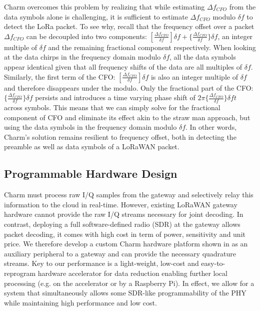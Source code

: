 Charm overcomes this problem by realizing that while estimating $\Delta
f_{CFO}$ from the data symbols alone is challenging, it is sufficient to
estimate $\Delta f_{CFO}$ modulo $\delta f$ to detect the LoRa packet. To see
why, recall that the frequency offset over a packet $\Delta f_{CFO}$ can be
decoupled into two components: $[\frac{\Delta f_{CFO}}{\delta f}]\delta f + \{\frac{\Delta f_{CFO}}{\delta f}\}\delta f$, an
integer multiple of $\delta f$ and the remaining fractional component
respectively. When looking at the data chirps in the frequency domain modulo
$\delta f$, all the data symbols appear identical given that all frequency
shifts of the data are all multiples of $\delta f$. Similarly, the first term of the CFO:
$[\frac{\Delta f_{CFO}}{\delta f}]\delta f$ is also an integer multiple of $\delta f$ and therefore disappears under the modulo. Only the fractional part of the CFO: $\{\frac{\Delta f_{CFO}}{\delta f}\}\delta f$ persists
and introduces a time varying phase shift of $2 \pi \{\frac{\Delta f_{CFO}}{\delta f}\}\delta f t$
across symbols. This means that we can simply solve for the fractional component of CFO and eliminate its effect akin to the straw man approach, but using the data
symbols in the frequency domain modulo $\delta f$. In other words, Charm's
solution remains resilient to frequency offset, both in detecting the preamble
as well as data symbols of a LoRaWAN packet.

\subsection{Programmable Hardware Design}
\label{sec:hardware}

Charm must process raw I/Q samples from the gateway and selectively relay this
information to the cloud in real-time. However, existing LoRaWAN gateway
hardware cannot provide the raw I/Q streams necessary for joint decoding. In
contrast, deploying a full software-defined radio (SDR) at the gateway allows
packet decoding, it comes with high cost in term of power, sensitivity and
unit price. We therefore develop a custom Charm hardware platform shown in
 as an auxiliary peripheral to a gateway and can
provide the necessary quadrature streams. Key to our performance is a
light-weight, low-cost and easy-to-reprogram hardware accelerator for data
reduction enabling further local processing (e.g. on the accelerator or by a
Raspberry Pi). In effect, we allow for a system that simultaneously allows
some SDR-like programmability of the PHY while maintaining high performance
and low cost.

